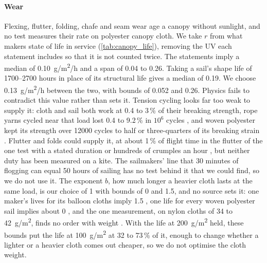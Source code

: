 \paragraph{Wear} Flexing, flutter, folding, chafe and seam wear age a canopy without sunlight, and no test measures their rate on polyester canopy cloth. We take $r$ from what makers state of life in service (\cref{tab:canopy_life}), removing the UV each statement includes so that it is not counted twice. The statements imply a median of \SI{0.10}{g/m^2/h} and a span of 0.04 to 0.26. Taking a sail's shape life of \numrange{1700}{2700} hours \citep{flynn2015} in place of its structural life gives a median of 0.19. We choose \SI{0.13}{g/m^2/h} between the two, with bounds of 0.052 and 0.26. Physics fails to contradict this value rather than sets it. Tension cycling looks far too weak to supply it: cloth and sail both work at 0.4 to 3\,\% of their breaking strength, rope yarns cycled near that load lost 0.4 to 9.2\,\% in $10^6$ cycles \citep{tti2006}, and woven polyester kept its strength over \num{12000} cycles to half or three-quarters of its breaking strain \citep{nosraty2013}. Flutter and folds could supply it, at about 1\,\% of flight time in the flutter of the one test with a stated duration \citep{doyle2011} or hundreds of crumples an hour \citep{maslanka2023}, but neither duty has been measured on a kite. The sailmakers' line that 30 minutes of flogging can equal 50 hours of sailing \citep{allatsea2007} has no test behind it that we could find, so we do not use it. The exponent $b$, how much longer a heavier cloth lasts at the same load, is our choice of 1 with bounds of 0 and 1.5, and no source sets it: one maker's lives for its balloon cloths imply 1.5 \citep{kubicek2026}, one life for every woven polyester sail implies about 0 \citep{flynn2015}, and the one measurement, on nylon cloths of 34 to \SI{42}{g/m^2}, finds no order with weight \citep{maslanka2023}. With the life at \SI{200}{g/m^2} held, these bounds put the life at \SI{100}{g/m^2} at 32 to 73\,\% of it, enough to change whether a lighter or a heavier cloth comes out cheaper, so we do not optimise the cloth weight.


